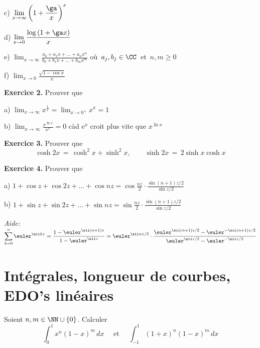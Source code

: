 \medskip
c) $\displaystyle \lim_{x \to \infty} 
    \left( 1+ \frac \ga x \right)^x$

\medskip
d) 
$\displaystyle \lim_{x \to 0} \frac{\log \left( 1+ \ga x \right)}{x}$


\medskip
e) 
$\displaystyle \lim_{x \to \infty} 
\frac{a_0+a_1x + \dots +a_nx^n}{b_0+b_1x + \dots +b_mx^m}$
\quad où\, $a_j, b_j \in \CC$ \,et\, $n,m \ge 0$

\medskip
f) 
$\displaystyle \lim_{x \to 0} \frac{\sqrt{1-\cos x}}{x}$  




{\bf Exercice 2.} Prouver que

\medskip
a)
$\displaystyle \lim_{x \to \infty} x^{\frac 1x} = \lim_{x \to 0^+} x^x = 1$

\medskip
b)
$\displaystyle \lim_{x \to \infty} \frac{x^{\ln x}}{{\mathrm e}^x} =0$
\quad
càd ${\mathrm e}^x$ croit plus vite que $x^{\ln x}$


{\bf Exercice 3.} Prouver que
$$
\cosh 2x \,=\, \cosh^2 x + \sinh^2 x,
\qquad
\sinh 2x \,=\, 2 \sinh x \cosh x
$$


{\bf Exercice 4.} Prouver que

a)
$1 + \cos z + \cos 2z + \dots + \cos nz = \displaystyle \cos \frac{nz}{2} \cdot \frac{\sin (n+1)z/2}{\sin z/2}$

b)
$1 + \sin z + \sin 2z + \dots + \sin nz = \displaystyle \sin \frac{nz}{2} \cdot \frac{\sin (n+1)z/2}{\sin z/2}$

{\it Aide:}\;
$\displaystyle \sum_{k=0}^n 
\euler^{\sii kz} 
= 
\frac{1-\euler^{\sii (n+1)z}}{1-\euler^{\sii z}}
= \euler^{\sii nz/2} \cdot \frac{\euler^{\sii (n+1)z/2} - \euler^{-\sii (n+1)z/2}}{
\euler^{\sii z/2}-\euler^{-\sii z/2}}
$






\section{Intégrales, longueur de courbes, EDO's linéaires}


\exerNico 
Soient $n,m \in \NN \cup \{0\}$.
Calculer
$$
\int_0^1 x^n (1-x)^m \,dx
\quad \text{ et } \quad
\int_{-1}^1 (1+x)^n (1-x)^m \,dx
$$


